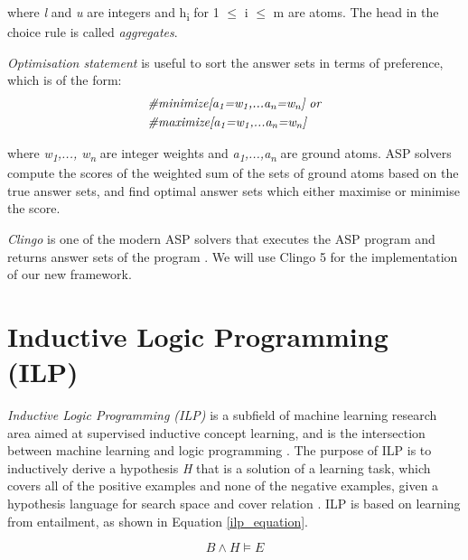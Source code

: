 \documentclass[11pt,twoside]{report}
\theoremstyle{plain}
\theoremstyle{definition}
\begin{document}
where \textit{l} and \textit{u} are integers and h\textsubscript{i} for 1 $\leq$ i $\leq$ m are atoms. The head in the choice rule is called \textit{aggregates}.

\textit{Optimisation statement} is useful to sort the answer sets in terms of preference, which is of the form:
\begin{equation}
\begin{split}
&\textit{\#minimize[a\textsubscript{1}=w\textsubscript{1},...a\textsubscript{n}=w\textsubscript{n}]} \ \textit{or} \\
&\textit{\#maximize[a\textsubscript{1}=w\textsubscript{1},...a\textsubscript{n}=w\textsubscript{n}]} \\
\end{split}
\label{asp_optimisation_statement}
\end{equation}

where \textit{w\textsubscript{1},..., w\textsubscript{n}} are integer weights and \textit{a\textsubscript{1},...,a\textsubscript{n}} are ground atoms.  ASP solvers compute the scores of the weighted sum of the sets of ground atoms based on the true answer sets, and find optimal answer sets which either maximise or minimise the score.

\textit{Clingo} is one of the modern ASP solvers that executes the ASP program and returns answer sets of the program \cite{Gebser2011}. We will use Clingo 5 for the implementation of our new framework.


\section{Inductive Logic Programming (ILP)}
\label{sec:ilp}

\textit{Inductive Logic Programming (ILP)} is a subfield of machine learning research area aimed at supervised inductive concept learning, and is the intersection between machine learning and logic programming \cite{Muggleton1991}. 
The purpose of ILP is to inductively derive a hypothesis \textit{H} that is a solution of a learning task, which covers all of the positive examples and none of the negative examples, given a hypothesis language for search space and cover relation \cite{DeRaedt1997}. 
ILP is based on learning from entailment, as shown in Equation \ref{ilp_equation}.

\begin{equation}\label{ilp_equation}
B \wedge H \models E
\end{equation}
\end{document}
